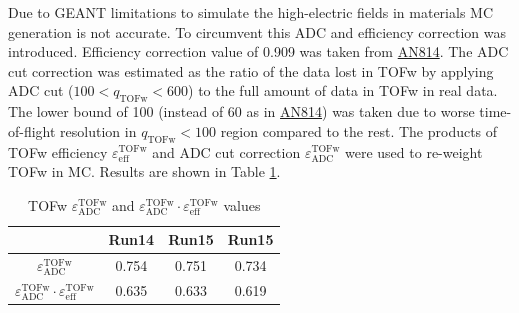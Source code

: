 Due to GEANT limitations to simulate the high-electric fields in materials MC generation is not accurate. 
To circumvent this ADC and efficiency correction was introduced. Efficiency correction value of 0.909 was taken from \href{https://phenix-intra.sdcc.bnl.gov/phenix/WWW/p/draft/belmonrj/AnalysisNotes/ananoterun7.pdf}{AN814}. 
The ADC cut correction was estimated as the ratio of the data lost in TOFw by applying ADC cut ($100 < q_{\text{TOFw}} < 600$) to the full amount of data in TOFw in real data. 
The lower bound of 100 (instead of 60 as in \href{https://phenix-intra.sdcc.bnl.gov/phenix/WWW/p/draft/belmonrj/AnalysisNotes/ananoterun7.pdf}{AN814}) was taken due to worse time-of-flight resolution in $q_{\text{TOFw}} < 100$ region compared to the rest.
The products of TOFw efficiency $\varepsilon_{\text{eff}}^{\text{TOFw}}$ and ADC cut correction $\varepsilon_{\text{ADC}}^{\text{TOFw}}$ were used to re-weight TOFw in MC. Results are shown in Table \ref{table:tofw_adc_corr}.

\begin{table}[h!]
	\centering
	\begin{tabular}{c||c|c|c}
		 & Run14 \HeAu & Run15 \pAl & Run15 \pAu \\
		\hline
		\hline
      $\varepsilon_{\text{ADC}}^{\text{TOFw}}$ & 0.754 & 0.751 & 0.734 \\
		\hline
      $\varepsilon_{\text{ADC}}^{\text{TOFw}}\cdot\varepsilon_{\text{eff}}^{\text{TOFw}}$ & 0.635 & 0.633 & 0.619 \\
	\end{tabular}
   \caption{TOFw $\varepsilon_{\text{ADC}}^{\text{TOFw}}$ and $\varepsilon_{\text{ADC}}^{\text{TOFw}}\cdot\varepsilon_{\text{eff}}^{\text{TOFw}}$ values}
	\label{table:tofw_adc_corr}
\end{table}
